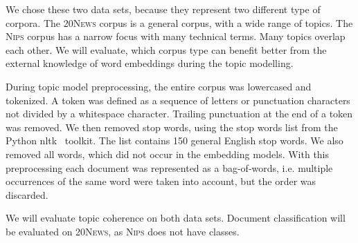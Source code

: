 \documentclass[
        a4paper,
        titlepage,
        twoside,
        parskip
        ]{scrbook}
\theoremstyle{break}
\begin{document}
We chose these two data sets, because they represent two different type of corpora.
The \textsc{20News} corpus is a general corpus, with a wide range of topics.
The \textsc{Nips} corpus has a narrow focus with many technical terms.
Many topics overlap each other.
We will evaluate, which corpus type can benefit better from the external knowledge of word embeddings during the topic modelling.

During topic model preprocessing, the entire corpus was lowercased and tokenized.
A token was defined as a sequence of letters or punctuation characters not divided by a whitespace character.
Trailing punctuation at the end of a token was removed.
We then removed stop words, using the stop words list from the Python nltk~\cite{Bird2009} toolkit.
The list contains 150 general English stop words.
We also removed all words, which did not occur in the embedding models.
With this preprocessing each document was represented as a bag-of-words, i.e. multiple occurrences of the same word were taken into account, but the order was discarded.

We will evaluate topic coherence on both data sets.
Document classification will be evaluated on \textsc{20News}, as \textsc{Nips} does not have classes.
\end{document}
